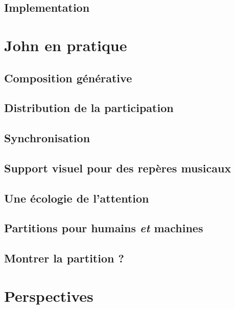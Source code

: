 \subsection{Implementation}

\section{John en pratique}
\subsection{Composition générative}
\subsection{Distribution de la participation}
\subsection{Synchronisation}
\subsection{Support visuel pour des repères musicaux}
\subsection{Une écologie de l'attention}
\subsection{Partitions pour humains \emph{et} machines}
\subsection{Montrer la partition ?}

\section{Perspectives}
